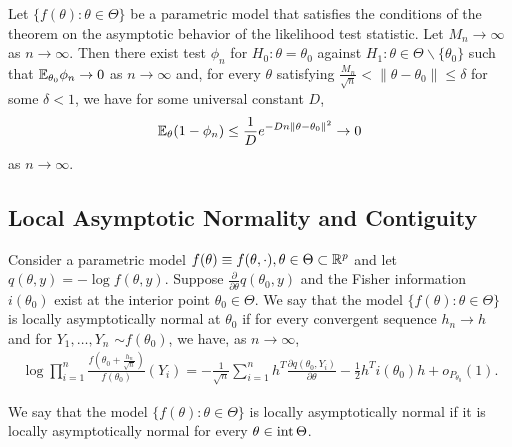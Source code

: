 \begin{thm}
  Let $\{ f(\theta) : \theta \in \Theta \} $ be a parametric model
  that satisfies the conditions of the theorem on the asymptotic
  behavior of the likelihood test statistic. Let $M_{n} \rightarrow
  \infty$ as $n \rightarrow \infty$.  Then there exist test $\phi_{n}$
  for $H_{0}: \theta = \theta_{0}$ against $H_{1}: \theta \in \Theta
  \backslash \{ \theta_{0} \} $ such that $\E_{\theta_{0}} \phi_{n}
  \rightarrow 0$ as $n \rightarrow \infty$ and, for every $\theta$
  satisfying $\frac{M_{n}}{\sqrt{n}} < \| \theta - \theta_{0} \| \leq
  \delta$ for some $\delta < 1$, we have for some universal constant
  $D$,
  \begin{equation}
    \label{eq:27}
    \E_{\theta}(1 - \phi_{n}) \leq \frac{1}{D} e^{-Dn \| \theta -
      \theta_{0} \|^{2}} \rightarrow 0
  \end{equation} as $n \rightarrow \infty$.
\end{thm}

\subsection{Local Asymptotic Normality and Contiguity}
\label{sec:local-asympt-norm}

\begin{defn}
  \label{sec:local-asympt-norm-1}
  Consider a parametric model $f(\theta) \equiv f(\theta, \cdot),
  \theta \in \Theta \subset \mathbb{R}^{p}$ and let $q(\theta, y) = - \log
  f(\theta, y)$.  Suppose $\frac{\partial}{\partial \theta}
  q(\theta_{0}, y)$ and the Fisher information $i(\theta_{0})$ exist
  at the interior point $\theta_{0} \in \Theta$.  We say that the
  model $\{ f(\theta): \theta \in \Theta \} $ is locally
  asymptotically normal at $\theta_{0}$ if for every convergent
  sequence $h_{n} \rightarrow h$ and for $Y_{1}, \dots, Y_{n}$ \iid
  $\sim f(\theta_{0})$, we have, as $n \rightarrow \infty$,
  \begin{align}
    \label{eq:28}
    \log \prod_{i=1}^{n} \frac{f(\theta_{0} +
      \frac{h_{n}}{\sqrt{n}})}{f(\theta_{0})}(Y_{i}) = -
    \frac{1}{\sqrt{n}} \sum_{i=1}^{n} h^{T} \frac{\partial
      q(\theta_{0}, Y_{i})}{\partial \theta} - \frac{1}{2} h^{T}
    i(\theta_{0}) h + o_{P_{\theta_{0}}}(1).
  \end{align}

  We say that the model $\{ f(\theta): \theta \in \Theta \} $ is
  locally asymptotically normal if it is locally asymptotically normal
  for every $\theta \in \operatorname*{int} \Theta$.
\end{defn}

